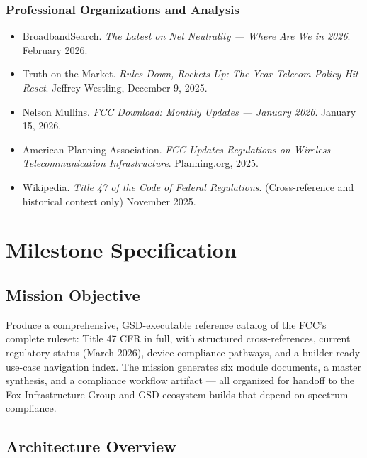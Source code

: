 \documentclass[11pt,letterpaper]{article}
\newcommand{\stageheader}[2]{%
  \noindent\colorbox{#2}{\makebox[\textwidth][l]{%
    \textcolor{white}{\bfseries\sffamily\hspace{6pt}#1\hspace{6pt}}}}%
  \vspace{0.5em}\par%
}
\begin{document}
\subsubsection{Professional Organizations and Analysis}

\begin{itemize}[leftmargin=1.5em]
  \item BroadbandSearch. \textit{The Latest on Net Neutrality --- Where Are We in 2026}. February 2026.
  \item Truth on the Market. \textit{Rules Down, Rockets Up: The Year Telecom Policy Hit Reset}. Jeffrey Westling, December 9, 2025.
  \item Nelson Mullins. \textit{FCC Download: Monthly Updates --- January 2026}. January 15, 2026.
  \item American Planning Association. \textit{FCC Updates Regulations on Wireless Telecommunication Infrastructure}. Planning.org, 2025.
  \item Wikipedia. \textit{Title 47 of the Code of Federal Regulations}. (Cross-reference and historical context only) November 2025.
\end{itemize}

\newpage

\stageheader{STAGE 3 --- MISSION PACKAGE}{tertiary}

\section{Milestone Specification}

\subsection{Mission Objective}

Produce a comprehensive, GSD-executable reference catalog of the FCC's complete ruleset: Title 47 CFR in full, with structured cross-references, current regulatory status (March 2026), device compliance pathways, and a builder-ready use-case navigation index. The mission generates six module documents, a master synthesis, and a compliance workflow artifact --- all organized for handoff to the Fox Infrastructure Group and GSD ecosystem builds that depend on spectrum compliance.

\subsection{Architecture Overview}
\end{document}
